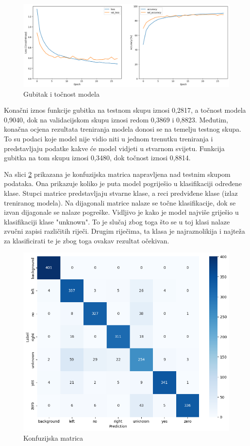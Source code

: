 \begin{figure}[htb]
    \centering
    \includegraphics[width=1\linewidth]{Chapters/neuronska_mreza/trening/acc.png} 
    \caption{Gubitak i točnost modela}
    \label{pic:accuracy}
\end{figure}

Konačni iznos funkcije gubitka na testnom skupu iznosi 0,2817, a točnost modela 0,9040, dok
na validacijskom skupu iznosi redom 0,3869 i 0,8823. Međutim, konačna ocjena rezultata
treniranja modela donosi se na temelju testnog skupa. To su podaci koje model nije vidio
niti u jednom trenutku treniranja i predstavljaju podatke kakve će model vidjeti u stvarnom
svijetu. Funkcija gubitka na tom skupu iznosi 0,3480, dok točnost iznosi 0,8814.

Na slici \ref{pic:confmtrx} prikazana je konfuzijska matrica napravljena nad
testnim skupom podataka. Ona prikazuje koliko je puta model pogriješio u klasifikaciji
određene klase. Stupci matrice predstavljaju stvarne klase, a reci predviđene klase
(izlaz treniranog modela). Na dijagonali matrice nalaze se točne klasifikacije, dok
se izvan dijagonale se nalaze pogreške. Vidljivo je kako je model najviše griješio
u klasifikaciji klase "unknown". To je slučaj zbog toga što se u toj klasi nalaze
zvučni zapisi različitih riječi. Drugim riječima, ta klasa je najraznolikija i najteža
za klasificirati te je zbog toga ovakav rezultat očekivan.

\begin{figure}[htb]
    \centering
    \includegraphics[width=0.7\linewidth]{Chapters/neuronska_mreza/trening/image.png} 
    \caption{Konfuzijska matrica}
    \label{pic:confmtrx}
\end{figure}

